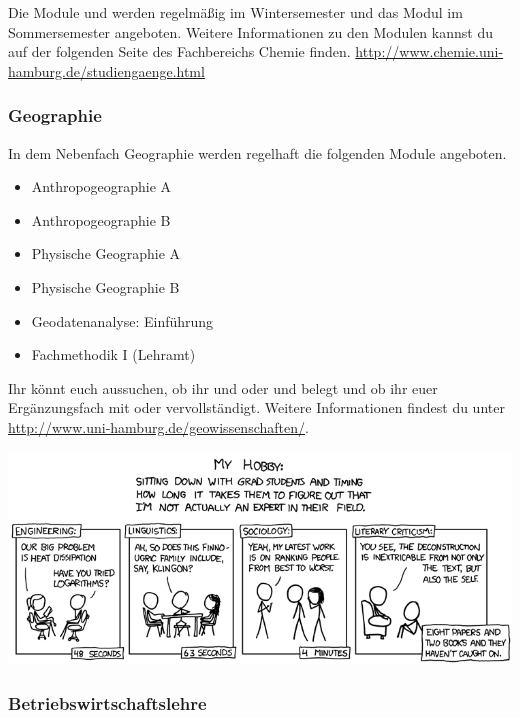 Die Module  und  werden regelmäßig im Wintersemester und das Modul
 im
Sommersemester angeboten. Weitere Informationen zu den Modulen kannst du auf
der folgenden Seite des Fachbereichs Chemie finden.
\url{http://www.chemie.uni-hamburg.de/studiengaenge.html}

\subsubsection{Geographie}

In dem Nebenfach Geographie werden regelhaft die folgenden Module angeboten.

\begin{itemize}\itemsep 0pt
    \item Anthropogeographie A
    \item Anthropogeographie B
    \item Physische Geographie A
    \item Physische Geographie B
    \item Geodatenanalyse: Einführung
    \item Fachmethodik I (Lehramt)
\end{itemize}

Ihr könnt euch aussuchen, ob ihr  und 
oder  und  belegt und ob ihr euer
Ergänzungsfach mit  oder  vervollständigt.  Weitere Informationen findest du unter
\url{http://www.uni-hamburg.de/geowissenschaften/}.

\begin{center}
\vfill\includegraphics[scale=.5]{comics/451}
\end{center}

\subsubsection{Betriebswirtschaftslehre}

